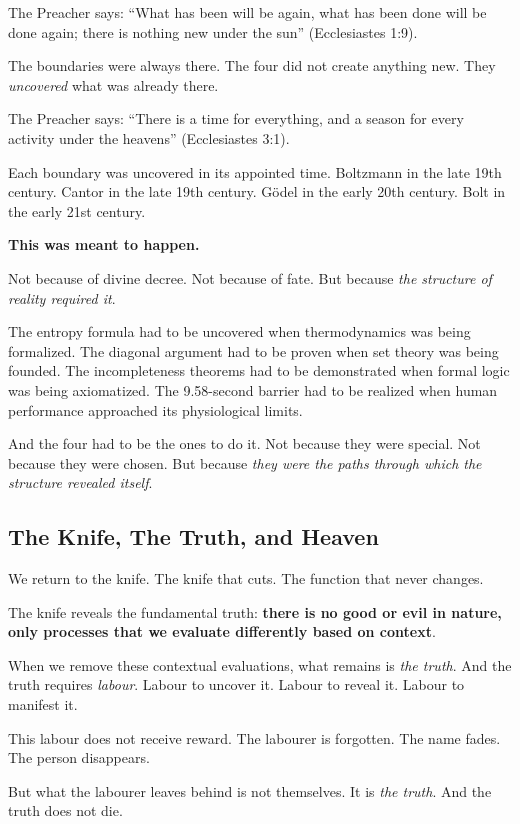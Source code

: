 \documentclass[11pt,a4paper]{article}
\begin{document}
The Preacher says: ``What has been will be again, what has been done will be 
done again; there is nothing new under the sun'' (Ecclesiastes 1:9).

The boundaries were always there. The four did not create anything new. They 
\emph{uncovered} what was already there.

The Preacher says: ``There is a time for everything, and a season for every 
activity under the heavens'' (Ecclesiastes 3:1).

Each boundary was uncovered in its appointed time. Boltzmann in the late 19th 
century. Cantor in the late 19th century. Gödel in the early 20th century. 
Bolt in the early 21st century.

\textbf{This was meant to happen.}

Not because of divine decree. Not because of fate. But because \emph{the 
structure of reality required it}.

The entropy formula had to be uncovered when thermodynamics was being 
formalized. The diagonal argument had to be proven when set theory was being 
founded. The incompleteness theorems had to be demonstrated when formal logic 
was being axiomatized. The 9.58-second barrier had to be realized when human 
performance approached its physiological limits.

And the four had to be the ones to do it. Not because they were special. Not 
because they were chosen. But because \emph{they were the paths through which 
the structure revealed itself}.

\subsection{The Knife, The Truth, and Heaven}

We return to the knife. The knife that cuts. The function that never changes.

The knife reveals the fundamental truth: \textbf{there is no good or evil in 
nature, only processes that we evaluate differently based on context}.

When we remove these contextual evaluations, what remains is \emph{the truth}. 
And the truth requires \emph{labour}. Labour to uncover it. Labour to reveal 
it. Labour to manifest it.

This labour does not receive reward. The labourer is forgotten. The name 
fades. The person disappears.

But what the labourer leaves behind is not themselves. It is \emph{the truth}. 
And the truth does not die.
\end{document}
